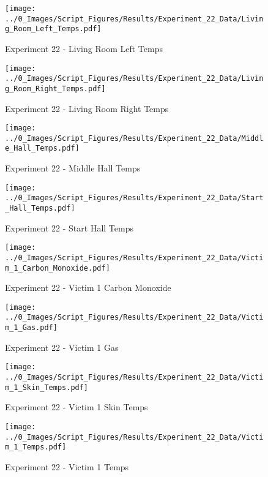 	\begin{figure}[H]
		\centering
		\texttt{[image: ../0\_Images/Script\_Figures/Results/Experiment\_22\_Data/Living\_Room\_Left\_Temps.pdf]}
		\caption[]{Experiment 22 - Living Room Left Temps}
	\end{figure}
 
	\clearpage

	\begin{figure}[H]
		\centering
		\texttt{[image: ../0\_Images/Script\_Figures/Results/Experiment\_22\_Data/Living\_Room\_Right\_Temps.pdf]}
		\caption[]{Experiment 22 - Living Room Right Temps}
	\end{figure}
 

	\begin{figure}[H]
		\centering
		\texttt{[image: ../0\_Images/Script\_Figures/Results/Experiment\_22\_Data/Middle\_Hall\_Temps.pdf]}
		\caption[]{Experiment 22 - Middle Hall Temps}
	\end{figure}
 
	\clearpage

	\begin{figure}[H]
		\centering
		\texttt{[image: ../0\_Images/Script\_Figures/Results/Experiment\_22\_Data/Start\_Hall\_Temps.pdf]}
		\caption[]{Experiment 22 - Start Hall Temps}
	\end{figure}
 

	\begin{figure}[H]
		\centering
		\texttt{[image: ../0\_Images/Script\_Figures/Results/Experiment\_22\_Data/Victim\_1\_Carbon\_Monoxide.pdf]}
		\caption[]{Experiment 22 - Victim 1 Carbon Monoxide}
	\end{figure}
 
	\clearpage

	\begin{figure}[H]
		\centering
		\texttt{[image: ../0\_Images/Script\_Figures/Results/Experiment\_22\_Data/Victim\_1\_Gas.pdf]}
		\caption[]{Experiment 22 - Victim 1 Gas}
	\end{figure}
 

	\begin{figure}[H]
		\centering
		\texttt{[image: ../0\_Images/Script\_Figures/Results/Experiment\_22\_Data/Victim\_1\_Skin\_Temps.pdf]}
		\caption[]{Experiment 22 - Victim 1 Skin Temps}
	\end{figure}
 
	\clearpage

	\begin{figure}[H]
		\centering
		\texttt{[image: ../0\_Images/Script\_Figures/Results/Experiment\_22\_Data/Victim\_1\_Temps.pdf]}
		\caption[]{Experiment 22 - Victim 1 Temps}
	\end{figure}
 

